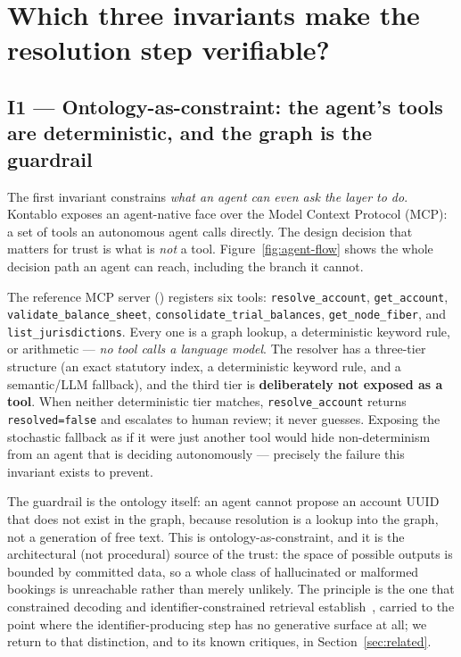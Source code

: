 \documentclass[11pt]{clapps}  %
\begin{document}
\section{Which three invariants make the resolution step verifiable?}

\subsection{I1 --- Ontology-as-constraint: the agent's tools are deterministic,
and the graph is the guardrail}

The first invariant constrains \emph{what an agent can even ask the layer to
do}. Kontablo exposes an agent-native face over the Model Context Protocol
(MCP): a set of tools an autonomous agent calls directly. The design decision
that matters for trust is what is \emph{not} a tool.
Figure~\ref{fig:agent-flow} shows the whole decision path an agent can reach,
including the branch it cannot.



The reference MCP server () registers six tools:
\texttt{resolve\_account}, \texttt{get\_account}, \texttt{validate\_balance\_sheet},
\texttt{consolidate\_trial\_balances}, \texttt{get\_node\_fiber}, and
\texttt{list\_jurisdictions}. Every one is a graph lookup, a deterministic
keyword rule, or arithmetic --- \emph{no tool calls a language model}. The
resolver has a three-tier structure (an exact statutory index, a deterministic
keyword rule, and a semantic/LLM fallback), and the third tier is
\textbf{deliberately not exposed as a tool}. When neither deterministic tier
matches, \texttt{resolve\_account} returns \texttt{resolved=false} and escalates
to human review; it never guesses. Exposing the stochastic fallback as if it
were just another tool would hide non-determinism from an agent that is deciding
autonomously --- precisely the failure this invariant exists to prevent.

The guardrail is the ontology itself: an agent cannot propose an account UUID
that does not exist in the graph, because resolution is a lookup into the graph,
not a generation of free text. This is ontology-as-constraint, and it is the
architectural (not procedural) source of the trust: the space of possible
outputs is bounded by committed data, so a whole class of hallucinated or
malformed bookings is unreachable rather than merely unlikely. The principle is
the one that constrained decoding and identifier-constrained retrieval
establish~\cite{koo2024automata,decao2021genre}, carried to the point where the
identifier-producing step has no generative surface at all; we return to that
distinction, and to its known critiques, in Section~\ref{sec:related}.
\end{document}
